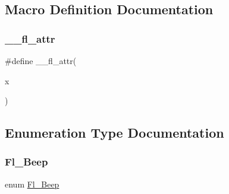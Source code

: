 \subsection{Macro Definition Documentation}
\mbox{\label{fl__ask_8_h_abd901bc7c322836b976d5ea9efc23258}} 
\subsubsection{\texorpdfstring{\+\_\+\+\_\+fl\+\_\+attr}{\_\_fl\_attr}}
{\footnotesize\ttfamily \#define \+\_\+\+\_\+fl\+\_\+attr(\begin{DoxyParamCaption}\item[{}]{x }\end{DoxyParamCaption})}



\subsection{Enumeration Type Documentation}
\mbox{\label{fl__ask_8_h_af2427850080f7b2ddc65f9a0f1e2067c}} 
\subsubsection{\texorpdfstring{Fl\+\_\+\+Beep}{Fl\_Beep}}
{\footnotesize\ttfamily enum \hyperlink{fl__ask_8_h_af2427850080f7b2ddc65f9a0f1e2067c}{Fl\+\_\+\+Beep}}

